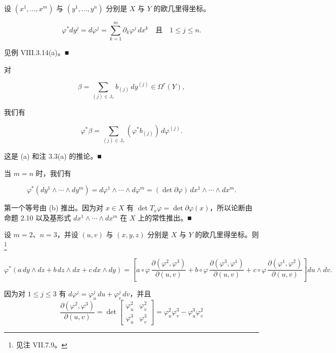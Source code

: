 \begin{example}

设 $ (x^{1}, \ldots, x^{m}) $ 与 $ (y^{1}, \ldots, y^{n}) $ 分别是 $ X $ 与 $ Y $ 的欧几里得坐标。

\begin{items}
\item
\[
\varphi^{*}dy^{j} = d\varphi^{j} = \sum_{k=1}^{m} \partial_{k}\varphi^{j}\,dx^{k} \quad \text{且} \quad 1 \le j \le n.
\]

\proofhead
见例 VIII.3.14(a)。\nobreak\hspace{0.35em}■
\item

对

\[
\beta = \sum_{(j) \in \mathbb{J}_{r}} b_{(j)}\,dy^{(j)} \in \Omega^{r}(Y),
\]

我们有

\[
\varphi^{*}\beta = \sum_{(j) \in \mathbb{J}_{r}} (\varphi^{*}b_{(j)})\,d\varphi^{(j)}.
\]

\proofhead
这是 (a) 和注 3.3(a) 的推论。\nobreak\hspace{0.35em}■
\item

当 $ m = n $ 时，我们有

\[
\varphi^{*}(dy^{1} \wedge \cdots \wedge dy^{m}) = d\varphi^{1} \wedge \cdots \wedge d\varphi^{m} = (\det\partial\varphi)\,dx^{1} \wedge \cdots \wedge dx^{m}.
\]

\proofhead
第一个等号由 (b) 推出。因为对 $ x \in X $ 有 $ \det T_{x}\varphi = \det\partial\varphi(x) $，所以论断由命题 2.10 以及基形式 $ dx^{1} \wedge \cdots \wedge dx^{m} $ 在 $ X $ 上的常性推出。\nobreak\hspace{0.35em}■
\item

设 $ m = 2 $、$ n = 3 $，并设 $ (u, v) $ 与 $ (x, y, z) $ 分别是 $ X $ 与 $ Y $ 的欧几里得坐标。则\footnote{见注 VII.7.9。}

\[
\varphi^{*}(a\,dy \wedge dz + b\,dz \wedge dx + c\,dx \wedge dy) = \left[a \circ \varphi\,\frac{\partial(\varphi^{2}, \varphi^{3})}{\partial(u, v)} + b \circ \varphi\,\frac{\partial(\varphi^{3}, \varphi^{1})}{\partial(u, v)} + c \circ \varphi\,\frac{\partial(\varphi^{1}, \varphi^{2})}{\partial(u, v)}\right] du \wedge dv.
\]

\proofhead
因为对 $ 1 \le j \le 3 $ 有 $ d\varphi^{j} = \varphi_{u}^{j}\,du + \varphi_{v}^{j}\,dv $，并且
\begin{equation*}
\frac{\partial(\varphi^{2}, \varphi^{3})}{\partial(u, v)} = \det\begin{bmatrix} \varphi_{u}^{2} & \varphi_{v}^{2} \\ \varphi_{u}^{3} & \varphi_{v}^{3} \end{bmatrix} = \varphi_{u}^{2}\varphi_{v}^{3} - \varphi_{u}^{3}\varphi_{v}^{2}
\end{equation*}


\end{items}
\end{example}
